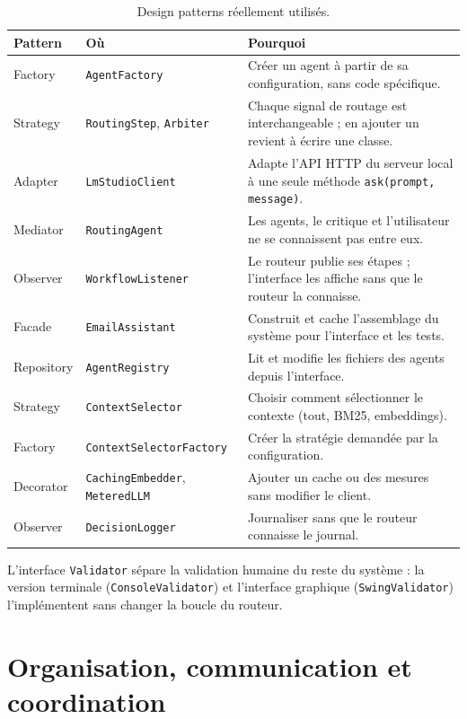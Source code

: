 \documentclass[11pt,a4paper]{article}
\newcommand{\code}[1]{\texttt{#1}}
\begin{document}
\begin{table}[H]
\centering
\small
\begin{tabularx}{\linewidth}{l l L}
\toprule
\textbf{Pattern} & \textbf{Où} & \textbf{Pourquoi} \\
\midrule
Factory & \code{AgentFactory} & Créer un agent à partir de sa configuration, sans code spécifique. \\
Strategy & \code{RoutingStep}, \code{Arbiter} & Chaque signal de routage est interchangeable ; en ajouter un revient à écrire une classe. \\
Adapter & \code{LmStudioClient} & Adapte l'API HTTP du serveur local à une seule méthode \code{ask(prompt, message)}. \\
Mediator & \code{RoutingAgent} & Les agents, le critique et l'utilisateur ne se connaissent pas entre eux. \\
Observer & \code{WorkflowListener} & Le routeur publie ses étapes ; l'interface les affiche sans que le routeur la connaisse. \\
Facade & \code{EmailAssistant} & Construit et cache l'assemblage du système pour l'interface et les tests. \\
Repository & \code{AgentRegistry} & Lit et modifie les fichiers des agents depuis l'interface. \\
Strategy & \code{ContextSelector} & Choisir comment sélectionner le contexte (tout, BM25, embeddings). \\
Factory & \code{ContextSelectorFactory} & Créer la stratégie demandée par la configuration. \\
Decorator & \code{CachingEmbedder}, \code{MeteredLLM} & Ajouter un cache ou des mesures sans modifier le client. \\
Observer & \code{DecisionLogger} & Journaliser sans que le routeur connaisse le journal. \\
\bottomrule
\end{tabularx}
\caption{Design patterns réellement utilisés.}
\end{table}

L'interface \code{Validator} sépare la validation humaine du reste du système : la version
terminale (\code{ConsoleValidator}) et l'interface graphique (\code{SwingValidator})
l'implémentent sans changer la boucle du routeur.

\section{Organisation, communication et coordination}
\end{document}
